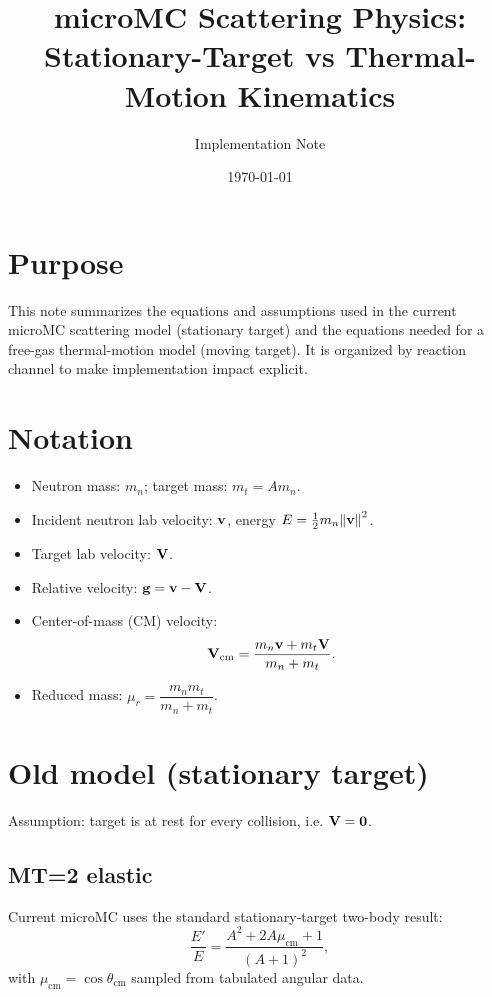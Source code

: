 \documentclass[11pt]{article}
\title{microMC Scattering Physics: Stationary-Target vs Thermal-Motion Kinematics}
\author{Implementation Note}
\date{\today}
\begin{document}
\maketitle

\section{Purpose}
This note summarizes the equations and assumptions used in the current microMC scattering model (stationary target) and the equations needed for a free-gas thermal-motion model (moving target). It is organized by reaction channel to make implementation impact explicit.

\section{Notation}
\begin{itemize}
  \item Neutron mass: $m_n$; target mass: $m_t = A m_n$.
  \item Incident neutron lab velocity: $\vb{v}$, energy $E = \tfrac{1}{2}m_n\norm{\vb{v}}^2$.
  \item Target lab velocity: $\vb{V}$.
  \item Relative velocity: $\vb{g} = \vb{v} - \vb{V}$.
  \item Center-of-mass (CM) velocity:
  \begin{equation}
    \vb{V}_{\text{cm}} = \frac{m_n\vb{v} + m_t\vb{V}}{m_n + m_t}.
  \end{equation}
  \item Reduced mass: $\mu_r = \dfrac{m_n m_t}{m_n+m_t}$.
\end{itemize}

\section{Old model (stationary target)}
Assumption: target is at rest for every collision, i.e. $\vb{V}=\vb{0}$.

\subsection{MT=2 elastic}
Current microMC uses the standard stationary-target two-body result:
\begin{equation}
  \frac{E'}{E} = \frac{A^2 + 2A\mu_{\text{cm}} + 1}{(A+1)^2},
\end{equation}
with $\mu_{\text{cm}}=\cos\theta_{\text{cm}}$ sampled from tabulated angular data.
\end{document}
